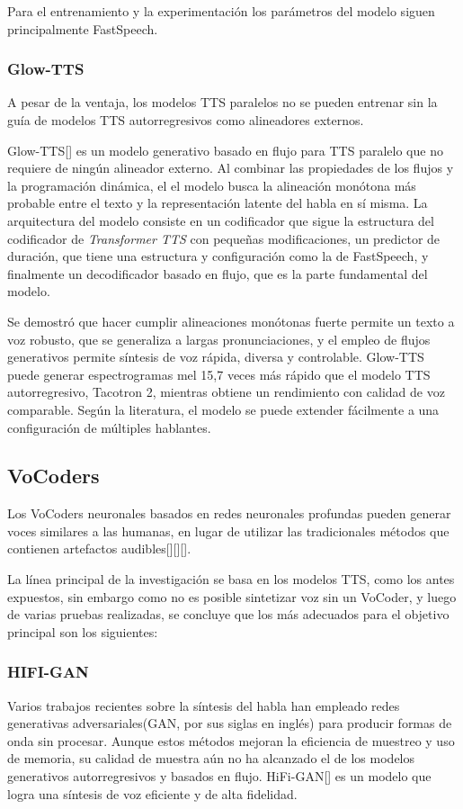 Para el entrenamiento y la experimentación los parámetros del modelo siguen principalmente FastSpeech.

\subsubsection{Glow-TTS}
A pesar de la ventaja, los modelos TTS paralelos no se pueden entrenar sin la guía de modelos TTS autorregresivos como alineadores externos. 

Glow-TTS[\cite{kim2020glow}] es un modelo generativo basado en flujo para TTS paralelo que no requiere de ningún alineador externo. Al combinar las propiedades de los flujos y la programación dinámica, el el modelo busca la alineación monótona más probable entre el texto y la representación latente del habla en sí misma.
La arquitectura del modelo consiste en un codificador que sigue la estructura del codificador de \textit{Transformer TTS} con pequeñas modificaciones, un predictor de duración, que tiene una estructura y configuración como la de FastSpeech, y finalmente un decodificador basado en flujo, que es la parte fundamental del modelo.

Se demostró que hacer cumplir alineaciones monótonas fuerte permite un texto a voz robusto, que se generaliza a largas pronunciaciones, y el empleo de flujos generativos permite síntesis de voz rápida, diversa y controlable. Glow-TTS puede generar espectrogramas mel 15,7 veces más rápido que el modelo TTS autorregresivo,
Tacotron 2, mientras obtiene un rendimiento con calidad de voz comparable. Según la literatura, el modelo se puede extender fácilmente a una configuración de múltiples hablantes.


\subsection{VoCoders}
  Los VoCoders neuronales basados en redes neuronales profundas pueden generar voces similares a las humanas, en lugar de utilizar las tradicionales
  métodos que contienen artefactos audibles[\cite{griffin1984signal}][\cite{kawahara1999restructuring}][\cite{morise2016world}]. 
  
  La línea principal de la investigación se basa en los modelos TTS, como los antes expuestos, sin embargo como no es posible sintetizar voz sin un VoCoder, y luego de varias pruebas realizadas, se concluye que los más adecuados para el objetivo principal son los siguientes:
  
\subsubsection{HIFI-GAN}
Varios trabajos recientes sobre la síntesis del habla han empleado redes generativas adversariales(GAN, por sus siglas en inglés) para producir formas de onda sin procesar. Aunque estos métodos mejoran la eficiencia de muestreo y uso de memoria, su calidad de muestra aún no ha alcanzado el de los modelos generativos autorregresivos y basados en flujo. HiFi-GAN[\cite{kong2020hifi}] es un modelo que logra una síntesis de voz eficiente y de alta fidelidad.

